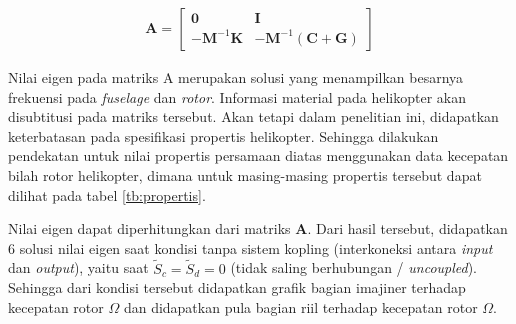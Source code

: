 \begin{align*}
	\mathbf{A}=\begin{bmatrix}
	\mathbf{0}& \mathbf{I}\\
	\mathbf{-M}^{-1}\mathbf{K}& \mathbf{-M}^{-1}(\mathbf{C}+\mathbf{G})
	\end{bmatrix}
\end{align*}

Nilai eigen pada matriks A merupakan solusi yang menampilkan besarnya frekuensi pada \textit{fuselage} dan \textit{rotor}. Informasi material pada helikopter akan disubtitusi pada matriks tersebut. Akan tetapi dalam penelitian ini, didapatkan keterbatasan pada spesifikasi propertis helikopter. Sehingga dilakukan pendekatan untuk nilai propertis persamaan diatas menggunakan data kecepatan bilah rotor helikopter, dimana untuk masing-masing propertis tersebut dapat dilihat pada tabel \ref{tb:propertis}.

\begin{table}[h]
	\centering
	\caption{Pendekatan nilai propertis helikopter.}
	\label{tb:propertis}
\end{table}

Nilai eigen dapat diperhitungkan dari matriks $\mathbf{A}$. Dari hasil tersebut, didapatkan 6 solusi nilai eigen saat kondisi tanpa sistem kopling (interkoneksi antara \textit{input} dan \textit{output}), yaitu saat $\tilde{S}_c = \tilde{S}_d = 0$ (tidak saling berhubungan / \textit{uncoupled}). Sehingga dari kondisi tersebut didapatkan grafik bagian imajiner terhadap kecepatan rotor $\Omega$ dan didapatkan pula bagian riil terhadap kecepatan rotor $\Omega$.

